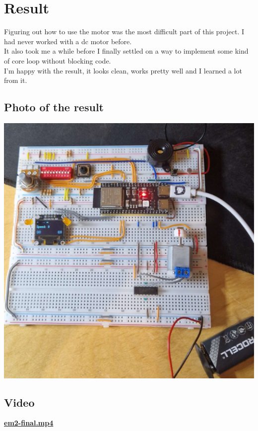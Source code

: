 \section{Result}
\graphicspath{ {./images/} }
\label{sec:result}

Figuring out how to use the motor was the most difficult part of this project. I had never worked with a dc motor before.\\
It also took me a while before I finally settled on a way to implement some kind of core loop without blocking code.\\
I'm happy with the result, it looks clean, works pretty well and I learned a lot from it.

\subsection{Photo of the result}
\includegraphics[scale=0.5]{img/full.png}

\subsection{Video}
\href{https://drive.google.com/file/d/1thjF8QUzhYgOUyeoF4rN1gPpm4-Ktiq-/view?usp=sharing}{\textbf{em2-final.mp4}}